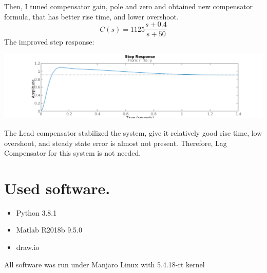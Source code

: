 \documentclass[a4paper,12pt]{article}
\begin{document}
    Then, I tuned compensator gain, pole and zero and obtained new compensator
    formula, that has better rise time, and lower overshoot.
    \begin{equation*}
        C(s) = 1125 \frac{s+0.4}{s+50}
    \end{equation*}
    The improved step response:
    \begin{center}
        \includegraphics[width=\linewidth]{../Task4/LeadTuned.pdf}
    \end{center}
    The Lead compensator stabilized the system, give it relatively good rise time,
    low overshoot, and steady state error is almost not present. Therefore, 
    Lag Compensator for this system is not needed.
 
\section{Used software.}
\begin{itemize}
    \item Python 3.8.1
    \item Matlab R2018b 9.5.0
    \item draw.io
\end{itemize}
All software was run under Manjaro Linux with 5.4.18-rt kernel
\end{document}
